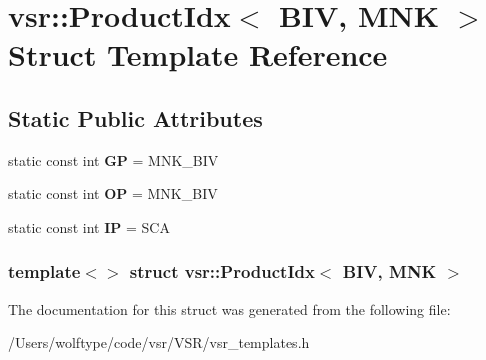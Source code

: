\hypertarget{structvsr_1_1_product_idx_3_01_b_i_v_00_01_m_n_k_01_4}{\section{vsr\-:\-:Product\-Idx$<$ B\-I\-V, M\-N\-K $>$ Struct Template Reference}
\label{structvsr_1_1_product_idx_3_01_b_i_v_00_01_m_n_k_01_4}
}
\subsection*{Static Public Attributes}
\begin{DoxyCompactItemize}
\item 
\hypertarget{structvsr_1_1_product_idx_3_01_b_i_v_00_01_m_n_k_01_4_a535c3c85f5de5a8c1c0d84f6ae3dec70}{static const int {\bfseries G\-P} = M\-N\-K\-\_\-\-B\-I\-V}\label{structvsr_1_1_product_idx_3_01_b_i_v_00_01_m_n_k_01_4_a535c3c85f5de5a8c1c0d84f6ae3dec70}

\item 
\hypertarget{structvsr_1_1_product_idx_3_01_b_i_v_00_01_m_n_k_01_4_a0b22c9270e8a14bf5fe3a2e40617d715}{static const int {\bfseries O\-P} = M\-N\-K\-\_\-\-B\-I\-V}\label{structvsr_1_1_product_idx_3_01_b_i_v_00_01_m_n_k_01_4_a0b22c9270e8a14bf5fe3a2e40617d715}

\item 
\hypertarget{structvsr_1_1_product_idx_3_01_b_i_v_00_01_m_n_k_01_4_a302584c4343c289f2924248bb42e9ba6}{static const int {\bfseries I\-P} = S\-C\-A}\label{structvsr_1_1_product_idx_3_01_b_i_v_00_01_m_n_k_01_4_a302584c4343c289f2924248bb42e9ba6}

\end{DoxyCompactItemize}
\subsubsection*{template$<$$>$ struct vsr\-::\-Product\-Idx$<$ B\-I\-V, M\-N\-K $>$}



The documentation for this struct was generated from the following file\-:\begin{DoxyCompactItemize}
\item 
/\-Users/wolftype/code/vsr/\-V\-S\-R/vsr\-\_\-templates.\-h\end{DoxyCompactItemize}
